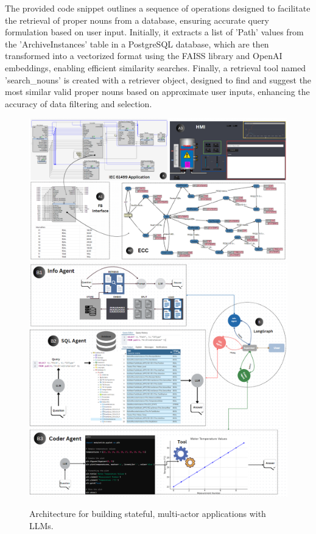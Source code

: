 \documentclass[conference]{IEEEtran}
\begin{document}
The provided code snippet outlines a sequence of operations designed to facilitate the retrieval of proper nouns from a database, ensuring accurate query formulation based on user input. Initially, it extracts a list of 'Path' values from the 'ArchiveInstances' table in a PostgreSQL database, which are then transformed into a vectorized format using the FAISS library and OpenAI embeddings, enabling efficient similarity searches. Finally, a retrieval tool named 'search\_nouns' is created with a retriever object, designed to find and suggest the most similar valid proper nouns based on approximate user inputs, enhancing the accuracy of data filtering and selection.


\begin{figure}
    \centering
    \includegraphics[width=.8\textwidth]{images/IEC61499App.PNG}
    \includegraphics[width=.8\textwidth]{images/LangGraph.PNG}
    \caption{Architecture for building stateful, multi-actor applications with LLMs.}
    \label{fig:Architecture}
\end{figure}
\end{document}
